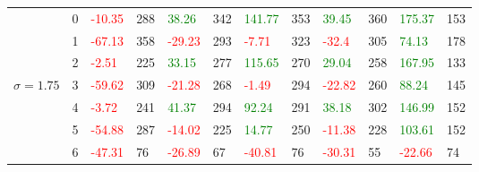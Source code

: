 \begin{table}[!htb]
\begin{adjustwidth}{-0.8in}{-0.9in}
\begin{tabular}{|p{4em}|p{2em}|p{3em}|p{3em}|p{3em}|p{3em}|p{3em}|p{3em}|p{3em}|p{3em}|p{3em}|p{3em}|}
            & 0 & \textcolor{red}{-10.35} & 288 & \textcolor{green}{38.26} & 342 & \textcolor{green}{141.77} & 353 & \textcolor{green}{39.45} & 360 & \textcolor{green}{175.37} & 153\\\cline{3-12}
            & 1 & \textcolor{red}{-67.13} & 358 & \textcolor{red}{-29.23} & 293 & \textcolor{red}{-7.71} & 323 & \textcolor{red}{-32.4} & 305 & \textcolor{green}{74.13} & 178\\\cline{3-12}
            & 2 & \textcolor{red}{-2.51} & 225 & \textcolor{green}{33.15} & 277 & \textcolor{green}{115.65} & 270 & \textcolor{green}{29.04} & 258 & \textcolor{green}{167.95} & 133\\\cline{3-12}
            $\sigma=1.75$ & 3 & \textcolor{red}{-59.62} & 309 & \textcolor{red}{-21.28} & 268 & \textcolor{red}{-1.49} & 294 & \textcolor{red}{-22.82} & 260 & \textcolor{green}{88.24} & 145\\\cline{3-12}
            & 4 & \textcolor{red}{-3.72} & 241 & \textcolor{green}{41.37} & 294 & \textcolor{green}{92.24} & 291 & \textcolor{green}{38.18} & 302 & \textcolor{green}{146.99} & 152\\\cline{3-12}
            & 5 & \textcolor{red}{-54.88} & 287 & \textcolor{red}{-14.02} & 225 & \textcolor{green}{14.77} & 250 & \textcolor{red}{-11.38} & 228 & \textcolor{green}{103.61} & 152\\\cline{3-12}
            & 6 & \textcolor{red}{-47.31} & 76 & \textcolor{red}{-26.89} & 67 & \textcolor{red}{-40.81} & 76 & \textcolor{red}{-30.31} & 55 & \textcolor{red}{-22.66} & 74\\\hline\hline
            

\end{tabular}
\end{adjustwidth}
\end{table}
